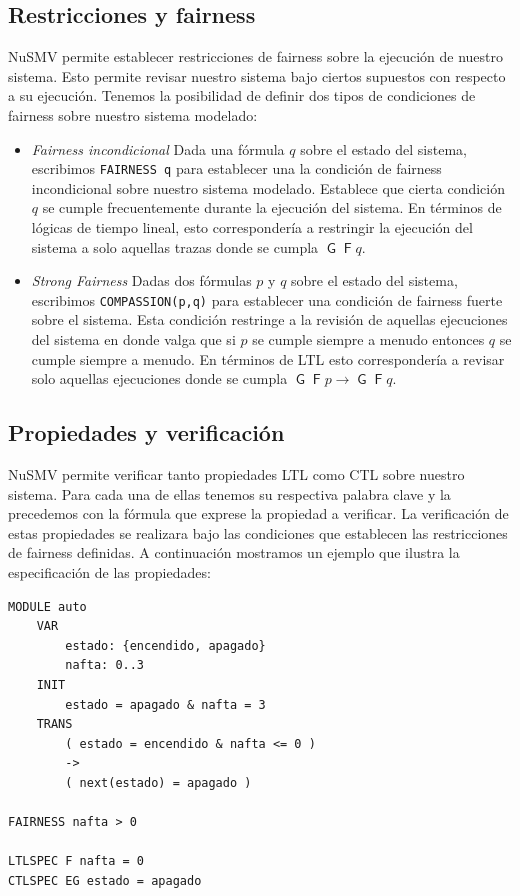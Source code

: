 \documentclass[titlepage, 12pt]{book}
\newcommand{\G}{\mathop{\mathsf{G}}}
\newcommand{\F}{\mathop{\mathsf{F}}}
\begin{document}
\subsection*{Restricciones y fairness}

NuSMV permite establecer restricciones de fairness sobre la ejecuci\'on de nuestro sistema. Esto permite revisar nuestro sistema bajo ciertos supuestos con respecto a su ejecuci\'on. Tenemos la posibilidad de definir dos tipos de condiciones de fairness sobre nuestro sistema modelado:
\begin{itemize}

\item \textit{Fairness incondicional} Dada una f\'ormula $q$ sobre el estado del sistema, escribimos \texttt{FAIRNESS q} para establecer una la condici\'on de fairness incondicional sobre nuestro sistema modelado. Establece que cierta condici\'on $q$ se cumple frecuentemente durante la ejecuci\'on del sistema. En t\'erminos de l\'ogicas de tiempo lineal, esto corresponder\'ia a restringir la ejecuci\'on del sistema a solo aquellas trazas donde se cumpla $\G \F q$.

\item \textit{Strong Fairness} Dadas dos f\'ormulas $p$ y $q$ sobre el estado del sistema, escribimos \texttt{COMPASSION(p,q)} para establecer una condici\'on de fairness fuerte sobre el sistema. Esta condici\'on restringe a la revisi\'on de aquellas ejecuciones del sistema en donde valga que si $p$ se cumple siempre a menudo entonces $q$ se cumple siempre a menudo. En t\'erminos de LTL esto corresponder\'ia a revisar solo aquellas ejecuciones donde se cumpla $\G \F p \rightarrow \G \F q$.

\end{itemize}

\subsection*{Propiedades y verificaci\'on}

NuSMV permite verificar tanto propiedades LTL como CTL sobre nuestro sistema. Para cada una de ellas tenemos su respectiva palabra clave y la precedemos con la f\'ormula que exprese la propiedad a verificar. La verificaci\'on de estas propiedades se realizara bajo las condiciones que establecen las restricciones de fairness definidas. A continuaci\'on mostramos un ejemplo que ilustra la especificaci\'on de las propiedades:

\begin{verbatim}
MODULE auto
    VAR
        estado: {encendido, apagado}
        nafta: 0..3
    INIT
        estado = apagado & nafta = 3
    TRANS
        ( estado = encendido & nafta <= 0 ) 
        -> 
        ( next(estado) = apagado )

FAIRNESS nafta > 0

LTLSPEC F nafta = 0
CTLSPEC EG estado = apagado
\end{verbatim}
\end{document}
